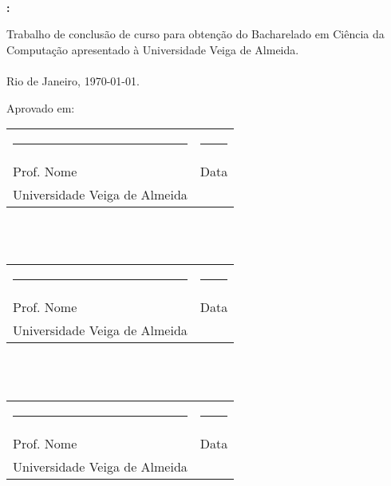
\begin{center}

    \thispagestyle{pretext}
    
    \ \\ 
    \printAuthors

    \vfill

    \textbf{\uppercase\expandafter{\TitleName}:} \\
    \textbf{\uppercase\expandafter{\SubtitleName}}

    \vfill


    \begin{adjustwidth}{7.5cm}{}
        \noindent Trabalho de conclusão de curso para obtenção do Bacharelado em Ciência da Computação apresentado à Universidade Veiga de Almeida. \\ \ \\
        
        Rio de Janeiro, \today.
    \end{adjustwidth}

\end{center}

\vfill

Aprovado em:\\[0.5cm]

\begin{tabularx}{\textwidth}{Xc}
    \rule{0.6\textwidth}{0.4pt} & \rule{0.3\textwidth}{0.4pt} \\

    Prof. Nome & Data \\ 
    Universidade Veiga de Almeida
\end{tabularx} \\ \ \\

\begin{tabularx}{\textwidth}{Xc}
    \rule{0.6\textwidth}{0.4pt} & \rule{0.3\textwidth}{0.4pt} \\

    Prof. Nome & Data \\ 
    Universidade Veiga de Almeida
\end{tabularx} \\ \ \\

\begin{tabularx}{\textwidth}{Xc}
    \rule{0.6\textwidth}{0.4pt} & \rule{0.3\textwidth}{0.4pt} \\

    Prof. Nome & Data \\ 
    Universidade Veiga de Almeida
\end{tabularx}


\vfill


\newpage
